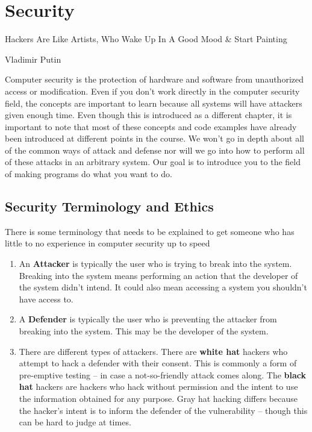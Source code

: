 \chapter{Security}

\epigraph{Hackers Are Like Artists, Who Wake Up In A Good Mood \& Start Painting}{Vladimir Putin}

Computer security is the protection of hardware and software from unauthorized access or modification.
Even if you don't work directly in the computer security field, the concepts are important to learn because all systems will have attackers given enough time.
Even though this is introduced as a different chapter, it is important to note that most of these concepts and code examples have already been introduced at different points in the course.
We won't go in depth about all of the common ways of attack and defense nor will we go into how to perform all of these attacks in an arbitrary system.
Our goal is to introduce you to the field of making programs do what you want to do.

\section{Security Terminology and Ethics}

There is some terminology that needs to be explained to get someone who has little to no experience in computer security up to speed

\begin{enumerate}
\item An \textbf{Attacker} is typically the user who is trying to break into the system. Breaking into the system means performing an action that the developer of the system didn't intend. It could also mean accessing a system you shouldn't have access to.
\item A \textbf{Defender} is typically the user who is preventing the attacker from breaking into the system. This may be the developer of the system.
\item There are different types of attackers. There are \textbf{white hat} hackers who attempt to hack a defender with their consent. This is commonly a form of pre-emptive testing -- in case a not-so-friendly attack comes along. The \textbf{black hat} hackers are hackers who hack without permission and the intent to use the information obtained for any purpose. Gray hat hacking differs because the hacker's intent is to inform the defender of the vulnerability -- though this can be hard to judge at times.
\end{enumerate}

